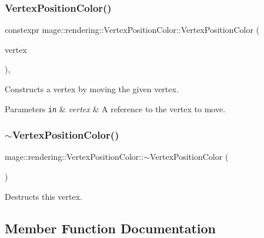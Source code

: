 \subsubsection{\texorpdfstring{Vertex\+Position\+Color()}{VertexPositionColor()}\hspace{0.1cm}{\footnotesize\ttfamily [4/4]}}
{\footnotesize\ttfamily constexpr mage\+::rendering\+::\+Vertex\+Position\+Color\+::\+Vertex\+Position\+Color (\begin{DoxyParamCaption}\item[{\mbox{\hyperlink{structmage_1_1rendering_1_1_vertex_position_color}{Vertex\+Position\+Color}} \&\&}]{vertex }\end{DoxyParamCaption})\hspace{0.3cm}{\ttfamily [default]}, {\ttfamily [noexcept]}}

Constructs a vertex by moving the given vertex.


\begin{DoxyParams}[1]{Parameters}
\mbox{\tt in}  & {\em vertex} & A reference to the vertex to move. \\
\hline
\end{DoxyParams}
\mbox{\label{structmage_1_1rendering_1_1_vertex_position_color_a80120768659e011119843c29df379e13}} 
\subsubsection{\texorpdfstring{$\sim$\+Vertex\+Position\+Color()}{~VertexPositionColor()}}
{\footnotesize\ttfamily mage\+::rendering\+::\+Vertex\+Position\+Color\+::$\sim$\+Vertex\+Position\+Color (\begin{DoxyParamCaption}{ }\end{DoxyParamCaption})\hspace{0.3cm}{\ttfamily [default]}}

Destructs this vertex. 

\subsection{Member Function Documentation}
\mbox{\label{structmage_1_1rendering_1_1_vertex_position_color_aea75d3acadad3cd6da04d0fc2207fc0c}} 
